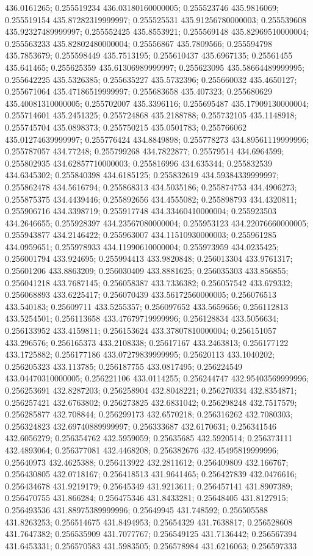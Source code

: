 436.0161265; 0.255519234 436.03180160000005; 0.255523746 435.9816069; 0.255519154 435.87282319999997; 0.255525531 435.91256780000003; 0.255539608 435.92327489999997; 0.255552425 435.8553921; 0.255569148 435.82969510000004; 0.255563233 435.82802480000004; 0.25556867 435.7809566; 0.255594798 435.7853679; 0.255598449 435.7513195; 0.255610437 435.6967135; 0.25561455 435.641465; 0.255625359 435.61306989999997; 0.255623095 435.58664489999995; 0.255642225 435.5326385; 0.255635227 435.5732396; 0.255660032 435.4650127; 0.255671064 435.47186519999997; 0.255683658 435.407323; 0.255680629 435.40081310000005; 0.255702007 435.3396116; 0.255695487 435.17909130000004; 0.255714601 435.2451325; 0.255724868 435.2188788; 0.255732105 435.1148918; 0.255745704 435.0898373; 0.255750215 435.0501783; 0.255766062 435.01274639999997; 0.255776424 434.8849898; 0.255778273 434.89561119999996; 0.255787057 434.77248; 0.255799268 434.7822877; 0.25579514 434.6964599; 0.255802935 434.62857710000003; 0.255816996 434.635344; 0.255832539 434.6345302; 0.255840398 434.6185125; 0.255832619 434.59384339999997; 0.255862478 434.5616794; 0.255868313 434.5035186; 0.255874753 434.4906273; 0.255875375 434.4439446; 0.255892656 434.4555082; 0.255898793 434.4320811; 0.255906716 434.3398719; 0.255917748 434.33460410000004; 0.255923503 434.2646655; 0.255928397 434.23567080000004; 0.255953123 434.22076660000005; 0.255943877 434.2146422; 0.255963007 434.11510930000003; 0.255961285 434.0959651; 0.255978933 434.11990610000004; 0.255973959 434.0235425; 0.256001794 433.924695; 0.255994413 433.9820848; 0.256013304 433.9761317; 0.25601206 433.8863209; 0.256030409 433.8881625; 0.256035303 433.856855; 0.256041218 433.7687145; 0.256058387 433.7336382; 0.256057542 433.679332; 0.256068893 433.6225417; 0.256070439 433.56172560000005; 0.256076513 433.540183; 0.25609711 433.5255357; 0.256097652 433.5659656; 0.256112813 433.5254501; 0.256113658 433.47679719999996; 0.256128834 433.5056634; 0.256133952 433.4159811; 0.256153624 433.37807810000004; 0.256151057 433.296576; 0.256165373 433.2108338; 0.25617167 433.2463813; 0.256177122 433.1725882; 0.256177186 433.07279839999995; 0.25620113 433.1040202; 0.256205323 433.113785; 0.256187755 433.0817495; 0.256224549 433.04470310000005; 0.256221106 433.0114255; 0.256244747 432.95403569999996; 0.256253691 432.8287203; 0.256258904 432.8048221; 0.256270334 432.8354871; 0.256257421 432.6763802; 0.256273825 432.6831042; 0.256298248 432.7517579; 0.256285877 432.708844; 0.256299173 432.6570218; 0.256316262 432.7080303; 0.256324823 432.69740889999997; 0.256333687 432.6170631; 0.256341546 432.6056279; 0.256354762 432.5959059; 0.25635685 432.5920514; 0.256373111 432.4893064; 0.256377081 432.4468208; 0.256382676 432.45495819999996; 0.25640973 432.4625388; 0.256413922 432.2811612; 0.256409809 432.166767; 0.256430805 432.0718167; 0.256418513 431.9641465; 0.256427839 432.0476616; 0.256434678 431.9219179; 0.25645349 431.9213611; 0.256457141 431.8907389; 0.256470755 431.866284; 0.256475346 431.8433281; 0.25648405 431.8127915; 0.256493536 431.88975389999996; 0.25649945 431.748592; 0.256505588 431.8263253; 0.256514675 431.8494953; 0.25654329 431.7638817; 0.256528608 431.7647382; 0.256535909 431.7077767; 0.256549125 431.7136442; 0.256567394 431.6453331; 0.256570583 431.5983505; 0.256578984 431.6216063; 0.256597333 